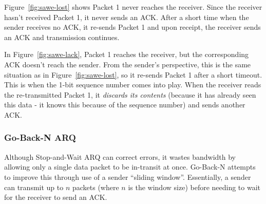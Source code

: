 \documentclass[a4paper]{article}
\numberwithin{figure}{section}
\numberwithin{table}{section}
\begin{document}
Figure~\ref{fig:sawe-lost} shows Packet 1 never reaches the receiver. Since the receiver hasn't received Packet 1, it never sends an ACK. After a short time when the sender receives no ACK, it re-sends Packet 1 and upon receipt, the receiver sends an ACK and transmission continues.

In Figure~\ref{fig:sawe-lack}, Packet 1 reaches the receiver, but the corresponding ACK doesn't reach the sender. From the sender's perspective, this is the same situation as in Figure~\ref{fig:sawe-lost}, so it re-sends Packet 1 after a short timeout. This is when the 1-bit sequence number comes into play. When the receiver reads the re-transmitted Packet 1, it \textit{discards its contents} (because it has already seen this data - it knows this because of the sequence number) and sends another ACK.

\newpage
\subsubsection{Go-Back-N ARQ}
Although Stop-and-Wait ARQ can correct errors, it wastes bandwidth by allowing only a single data packet to be in-transit at once. Go-Back-N attempts to improve this through use of a sender ``sliding window''. Essentially, a sender can transmit up to $n$ packets (where $n$ is the window size) before needing to wait for the receiver to send an ACK.
\end{document}
